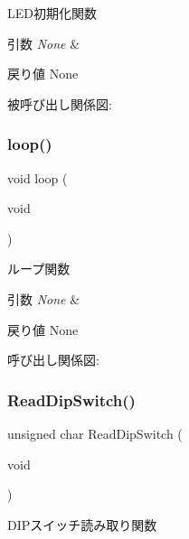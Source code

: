 L\+E\+D初期化関数 


\begin{DoxyParams}{引数}
{\em None} & \\
\hline
\end{DoxyParams}
\begin{DoxyReturn}{戻り値}
None 
\end{DoxyReturn}
被呼び出し関係図\+:
\mbox{\label{iraira__bo__up__down__mod_8ino_a0b33edabd7f1c4e4a0bf32c67269be2f}} 
\subsubsection{\texorpdfstring{loop()}{loop()}}
{\footnotesize\ttfamily void loop (\begin{DoxyParamCaption}\item[{void}]{ }\end{DoxyParamCaption})}



ループ関数 


\begin{DoxyParams}{引数}
{\em None} & \\
\hline
\end{DoxyParams}
\begin{DoxyReturn}{戻り値}
None 
\end{DoxyReturn}
呼び出し関係図\+:
\mbox{\label{iraira__bo__up__down__mod_8ino_a77b0a767d95108a48a54b857588d2863}} 
\subsubsection{\texorpdfstring{ReadDipSwitch()}{ReadDipSwitch()}}
{\footnotesize\ttfamily unsigned char Read\+Dip\+Switch (\begin{DoxyParamCaption}\item[{void}]{ }\end{DoxyParamCaption})}



D\+I\+Pスイッチ読み取り関数 


